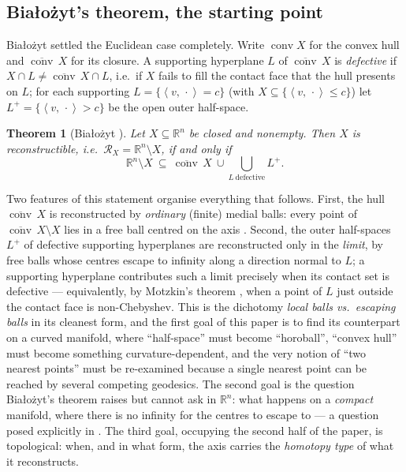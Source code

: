 \documentclass[11pt]{article}
\newtheorem{theorem}{Theorem}[section]
\theoremstyle{remark}
\newcommand{\R}{\mathbb{R}}
\newcommand{\X}{X}
\newcommand{\Rx}{\mathcal{R}_{\X}}
\newcommand{\conv}{\operatorname{conv}}
\newcommand{\sca}[2]{\left\langle #1,\, #2\right\rangle}
\begin{document}
\subsection{Bia\l{}o\.zyt's theorem, the starting point}

Bia\l{}o\.zyt \cite{Bia} settled the Euclidean case completely. Write
$\conv\X$ for the convex hull and $\overline{\conv}\,\X$ for its
closure. A supporting hyperplane $L$ of $\overline{\conv}\,\X$ is
\emph{defective} if $\X\cap L\neq\overline{\conv}\,\X\cap L$, i.e.\ if
$\X$ fails to fill the contact face that the hull presents on $L$; for
each supporting $L=\{\sca{v}{\cdot}=c\}$ (with $\X\subseteq
\{\sca{v}{\cdot}\le c\}$) let $L^{+}=\{\sca{v}{\cdot}>c\}$ be the open
outer half-space.

\begin{theorem}[Bia\l{}o\.zyt {\cite[Thm.~6]{Bia}}]\label{thm:bia}
Let $\X\subseteq\R^{n}$ be closed and nonempty. Then $\X$ is
reconstructible, i.e.\ $\Rx=\R^{n}\setminus\X$, if and only if
\[
  \R^{n}\setminus\X\ \subseteq\ \overline{\conv}\,\X\ \cup\!\!
  \bigcup_{L\ \text{defective}}\!\!L^{+}.
\]
\end{theorem}

Two features of this statement organise everything that follows.
First, the hull $\overline{\conv}\,\X$ is reconstructed by
\emph{ordinary} (finite) medial balls: every point of
$\overline{\conv}\,\X\setminus\X$ lies in a free ball centred on the
axis \cite{Bia}. Second, the outer half-spaces
$L^{+}$ of defective supporting hyperplanes are reconstructed only in
the \emph{limit}, by free balls whose centres escape to infinity along
a direction normal to $L$; a supporting hyperplane contributes such a
limit precisely when its contact set is defective --- equivalently,
by Motzkin's theorem \cite{Mot}, when a point of $L$ just outside the
contact face is non-Chebyshev. This is the dichotomy \emph{local
balls vs.\ escaping balls} in its cleanest form, and the first goal
of this paper is to find its counterpart on a curved manifold, where
``half-space'' must become ``horoball'', ``convex hull'' must become
something curvature-dependent, and the very notion of ``two nearest
points'' must be re-examined because a single nearest point can be
reached by several competing geodesics. The second goal is the
question Bia\l{}o\.zyt's theorem raises but cannot ask in $\R^{n}$:
what happens on a \emph{compact} manifold, where there is no
infinity for the centres to escape to --- a question posed explicitly
in \cite[\S5.2]{Bia}. The third goal, occupying the second half of
the paper, is topological: when, and in what form, the axis carries
the \emph{homotopy type} of what it reconstructs.
\end{document}
